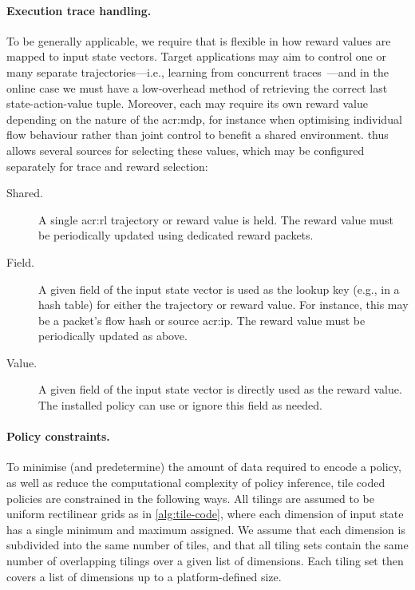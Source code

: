 \paragraph{Execution trace handling.}
To be generally applicable, we require that \approachshort{} is flexible in how reward values are mapped to input state vectors.
Target applications may aim to control one or many separate trajectories---i.e., learning from concurrent traces~\parencite{DBLP:conf/aamas/GroundsK07}---and in the online case we must have a low-overhead method of retrieving the correct last state-action-value tuple.
Moreover, each may require its own reward value depending on the nature of the \gls{acr:mdp}, for instance when optimising individual flow behaviour rather than joint control to benefit a shared environment.
\approachshort{} thus allows several sources for selecting these values, which may be configured separately for trace and reward selection:
\begin{description}
	\item[Shared.] A single \gls{acr:rl} trajectory or reward value is held. The reward value must be periodically updated using dedicated reward packets.
	\item[Field.] A given field of the input state vector is used as the lookup key (e.g., in a hash table) for either the trajectory or reward value. For instance, this may be a packet's flow hash or source \gls{acr:ip}. The reward value must be periodically updated as above.
	\item[Value.] A given field of the input state vector is directly used as the reward value. The installed policy can use or ignore this field as needed.
\end{description}

\paragraph{Policy constraints.}
To minimise (and predetermine) the amount of data required to encode a policy, as well as reduce the computational complexity of policy inference, tile coded policies are constrained in the following ways.
All tilings are assumed to be uniform rectilinear grids as in \cref{alg:tile-code}, where each dimension of input state has a single minimum and maximum assigned.
We assume that each dimension is subdivided into the same number of tiles, and that all tiling sets contain the same number of overlapping tilings over a given list of dimensions.
Each tiling set then covers a list of dimensions up to a platform-defined size.


